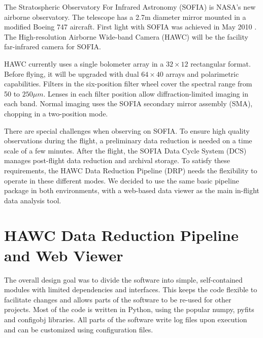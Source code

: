The Stratospheric Observatory For Infrared Astronomy (SOFIA) is NASA's new airborne observatory. The telescope has a 2.7m diameter mirror mounted in a modified Boeing 747 aircraft. First light with SOFIA was achieved in May 2010 \citep{herter12}. The High-resolution Airborne Wide-band Camera (HAWC) will be the facility far-infrared camera for SOFIA.

HAWC currently uses a single bolometer array in a $32\times12$ rectangular format. Before flying, it will be upgraded with dual $64\times40$ arrays and polarimetric capabilities. Filters in the six-position filter wheel cover the spectral range from 50 to $250\mu m$. Lenses in each filter position allow diffraction-limited imaging in each band. Normal imaging uses the SOFIA secondary mirror assembly (SMA), chopping in a two-position mode.

There are special challenges when observing on SOFIA. To ensure high quality observations during the flight, a preliminary data reduction is needed on a time scale of a few minutes. After the flight, the SOFIA Data Cycle System (DCS) \citep[see][]{P050_adassxxii} manages post-flight data reduction and archival storage. To satisfy these requirements, the HAWC Data Reduction Pipeline (DRP) needs the flexibility to operate in these different modes. We decided to use the same basic pipeline package in both environments, with a web-based data viewer as the main in-flight data analysis tool.

\section{HAWC Data Reduction Pipeline and Web Viewer}

The overall design goal was to divide the software into simple, self-contained modules with limited dependencies and interfaces. This keeps the code flexible to facilitate changes and allows parts of the software to be re-used for other projects. Most of the code is written in Python, using the popular numpy, pyfits and configobj libraries. All parts of the software write log files upon execution and can be customized using configuration files.

